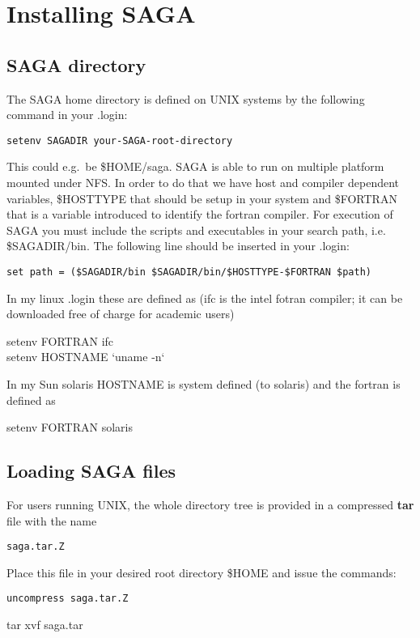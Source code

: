 \documentclass{saclantc}
\begin{document}
\section{Installing  SAGA}


\subsection{SAGA directory}
The {\sf SAGA} home directory is defined on UNIX systems by the
following command in your .login:
 
\noindent
{\tt setenv SAGADIR  your-SAGA-root-directory}

This could e.g.\ be \$HOME/saga. 
SAGA is able to run on multiple platform mounted under NFS. In order
to do that we have  host and compiler dependent variables,
\$HOSTTYPE that should be setup in your system and \$FORTRAN
that is a variable introduced to identify the fortran compiler.
For execution of  {\sf SAGA} you must include the scripts and executables in your
search path, i.e. \$SAGADIR/bin. The following line should be
inserted in your .login:

\noindent
{\tt set path = (\$SAGADIR/bin  \$SAGADIR/bin/\$HOSTTYPE-\$FORTRAN \$path)}


In my linux .login these are defined as (ifc is the intel fotran
compiler; it can be downloaded free of charge for academic users)

\begin{tt}
setenv FORTRAN    ifc \\
setenv HOSTNAME `uname -n` \\
\end{tt}

In my Sun solaris HOSTNAME is system defined (to solaris) and the
fortran is defined as

\begin{tt}
setenv FORTRAN    solaris
\end{tt}

\subsection{Loading  SAGA files}

For users running UNIX, the whole  directory tree is provided 
in a compressed {\bf tar} file with the name

{\tt saga.tar.Z}

\noindent Place this file in your desired root directory \$HOME and issue the
commands:

{\tt uncompress saga.tar.Z

tar xvf saga.tar}
\end{document}

